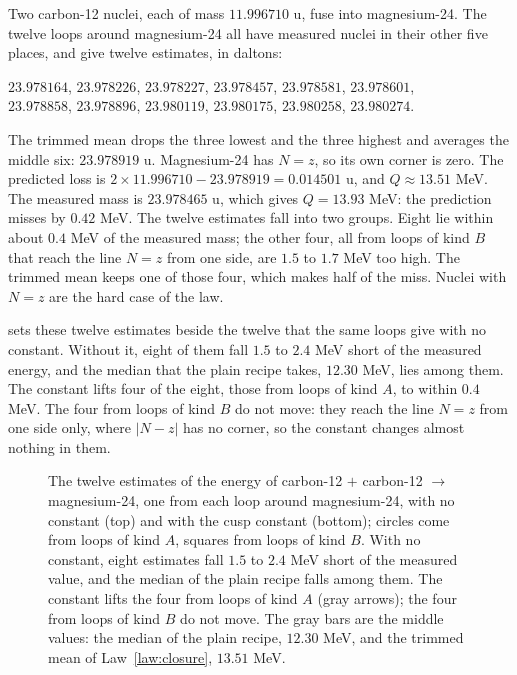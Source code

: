 \begin{workedexample}
Two carbon-12 nuclei, each of mass $11.996710$ u, fuse into magnesium-24. The twelve loops around magnesium-24 all have measured nuclei in their other five places, and give twelve estimates, in daltons:
\begin{center}
\small
$23.978164$, $23.978226$, $23.978227$, $23.978457$, $23.978581$, $23.978601$,\\
$23.978858$, $23.978896$, $23.980119$, $23.980175$, $23.980258$, $23.980274$.
\end{center}
The trimmed mean drops the three lowest and the three highest and averages the middle six: $23.978919$ u. Magnesium-24 has $N = z$, so its own corner is zero. The predicted loss is $2 \times 11.996710 - 23.978919 = 0.014501$ u, and $Q \approx 13.51$ MeV. The measured mass is $23.978465$ u, which gives $Q = 13.93$ MeV: the prediction misses by $0.42$ MeV. The twelve estimates fall into two groups. Eight lie within about $0.4$ MeV of the measured mass; the other four, all from loops of kind $B$ that reach the line $N = z$ from one side, are $1.5$ to $1.7$ MeV too high. The trimmed mean keeps one of those four, which makes half of the miss. Nuclei with $N = z$ are the hard case of the law.
\end{workedexample}

 sets these twelve estimates beside the twelve that the same loops give with no constant. Without it, eight of them fall $1.5$ to $2.4$ MeV short of the measured energy, and the median that the plain recipe takes, $12.30$ MeV, lies among them. The constant lifts four of the eight, those from loops of kind $A$, to within $0.4$ MeV. The four from loops of kind $B$ do not move: they reach the line $N = z$ from one side only, where $|N - z|$ has no corner, so the constant changes almost nothing in them.

\begin{figure}[tb]
\myfloatalign

\caption[Twelve loops, with and without the constant]{The twelve estimates of the energy of carbon-12 $+$ carbon-12 $\to$ magnesium-24, one from each loop around magnesium-24, with no constant (top) and with the cusp constant (bottom); circles come from loops of kind $A$, squares from loops of kind $B$. With no constant, eight estimates fall $1.5$ to $2.4$ MeV short of the measured value, and the median of the plain recipe falls among them. The constant lifts the four from loops of kind $A$ (gray arrows); the four from loops of kind $B$ do not move. The gray bars are the middle values: the median of the plain recipe, $12.30$ MeV, and the trimmed mean of Law~\ref{law:closure}, $13.51$ MeV.}
\label{fig:cl-twelve}
\end{figure}

